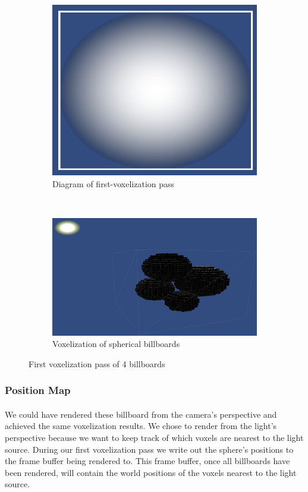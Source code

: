 \begin{figure}[t]
\begin{subfigure}[t]{0.48\textwidth}
	\includegraphics[width=\textwidth]{../res/spherebillboard.png}
	\caption{Diagram of first-voxelization pass}
	\end{subfigure}
	~
	\begin{subfigure}[t]{0.48\textwidth}
	\includegraphics[width=\textwidth]{../res/voxelize1.png}
	\caption{Voxelization of spherical billboards}
	\end{subfigure}
\caption{First voxelization pass of 4 billboards}
\end{figure}

\newpage
\subsubsection{Position Map}\paragraph{}
We could have rendered these billboard from the camera's perspective and achieved the same voxelization results. We chose to render from the light's perspective because we want to keep track of which voxels are nearest to the light source. 
During our first voxelization pass we write out the sphere's positions to the frame buffer being rendered to. This frame buffer, once all billboards have been rendered, will contain the world positions of the voxels nearest to the light source. 


